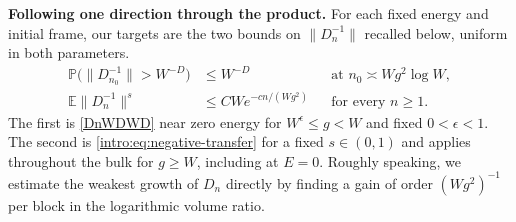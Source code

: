\documentclass[11pt]{article}
\numberwithin{equation}{section}
\theoremstyle{remark}
\newcommand{\E}{\mathbb E}
\newcommand{\Prob}{\mathbb P}
\begin{document}
\medskip\noindent\textbf{Following one direction through the product.}
For each fixed energy and initial frame, our targets are the two
bounds on $\|D_n^{-1}\|$ recalled below, uniform in both parameters.
\[
 \begin{aligned}
 \Prob\bigl(\|D_{n_0}^{-1}\|>W^{-D}\bigr)&\le W^{-D}
    &&\text{at } n_0\asymp Wg^2\log W,\\
 \E\|D_n^{-1}\|^s&\le CW e^{-cn/(Wg^2)}
    &&\text{for every } n\ge1.
 \end{aligned}
\]
The first is \eqref{DnWDWD} near zero energy for $W^\epsilon\le g<W$
and fixed $0<\epsilon<1$.
The second is \eqref{intro:eq:negative-transfer} for a fixed $s\in(0,1)$
and applies throughout the bulk for $g\ge W$, including at $E=0$.
Roughly speaking, we estimate the weakest growth of $D_n$ directly by
finding a gain of order $(Wg^2)^{-1}$ per block in the logarithmic
volume ratio.
\end{document}
